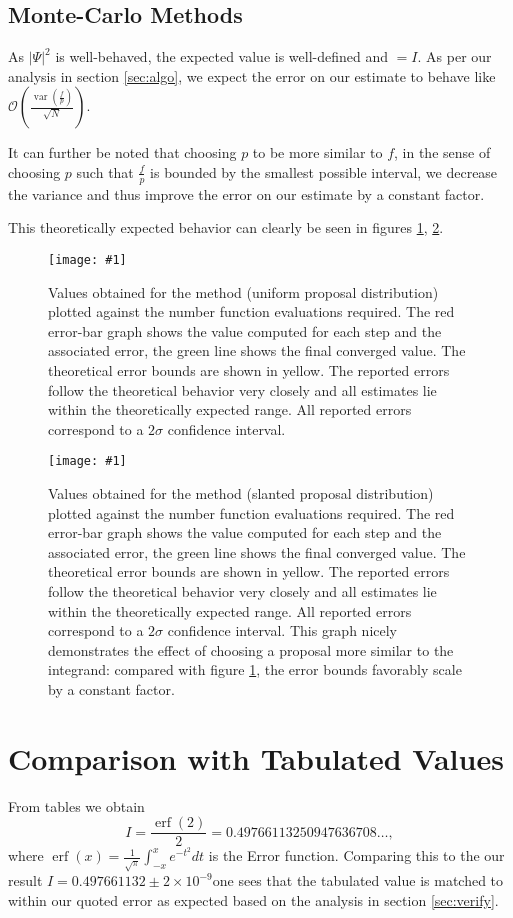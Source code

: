 \documentclass[10pt, a4paper]{article}
\newcommand{\plot}[3]{\begin{figure}[htp]\centering\texttt{[image: \#1]}\caption{#2}\label{#3}\end{figure}}
\newcommand{\final}{$I = 0.497661132 \pm 2\times10^{-9}$}
\begin{document}
  \subsection{Monte-Carlo Methods}
  As $|\Psi|^2$ is well-behaved, the expected value is well-defined and $= I$. As per our
  analysis in section \ref{sec:algo}, we expect the error on our estimate to behave like
  $\mathcal{O}\left( \frac{\operatorname{var}(\frac fp)}{\sqrt N} \right)$.

  It can further be noted that choosing $p$ to be more similar to $f$, in the sense of choosing $p$
  such that $\frac fp$ is bounded by the smallest possible interval, we decrease the variance and thus
  improve the error on our estimate by a constant factor.

  This theoretically expected behavior can clearly be seen in figures \ref{fig:mont-flat}, \ref{fig:mont-slant}.

  \plot{proj-mont-flat-accuracy}{
    Values obtained for the \is{} method (uniform proposal distribution) plotted against the number
    function evaluations required. The red
    error-bar graph shows the value computed for each step and the associated error, the green line
    shows the final converged value. The theoretical error bounds are shown in yellow. The reported errors
    follow the theoretical behavior very closely and all estimates lie within the theoretically expected range.
    All reported errors correspond to a $2\sigma$ confidence interval.
  }{fig:mont-flat}

  \plot{proj-mont-slanted-accuracy}{
    Values obtained for the \is{} method (slanted proposal distribution) plotted against the number
    function evaluations required. The red
    error-bar graph shows the value computed for each step and the associated error, the green line
    shows the final converged value. The theoretical error bounds are shown in yellow. The reported errors
    follow the theoretical behavior very closely and all estimates lie within the theoretically expected range.
    All reported errors correspond to a $2\sigma$ confidence interval. This graph nicely demonstrates the
    effect of choosing a proposal more similar to the integrand: compared with figure \ref{fig:mont-flat},
    the error bounds favorably scale by a constant factor.
  }{fig:mont-slant}

{}


\appendix{}

\section{Comparison with Tabulated Values}
\label{app:cheat}
From tables we obtain
\begin{equation}
I = \frac{\operatorname{erf}(2)}{2} = 0.49766113250947636708 \dots,
\end{equation}
where $\operatorname{erf}(x) = \frac{1}{\sqrt\pi}\int_{-x}^x e^{-t^2} dt$ is the Error function. Comparing
this to the our result \final one sees that the tabulated value is matched to within our
quoted error as expected based on the analysis in section \ref{sec:verify}.
\end{document}
